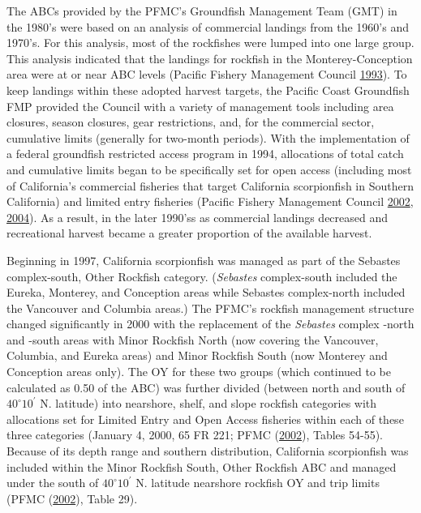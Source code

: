 \documentclass[12pt,]{article}
\begin{document}
The ABCs provided by the PFMC's Groundfish Management Team (GMT) in the
1980's were based on an analysis of commercial landings from the 1960's
and 1970's. For this analysis, most of the rockfishes were lumped into
one large group. This analysis indicated that the landings for rockfish
in the Monterey-Conception area were at or near ABC levels (Pacific
Fishery Management Council \protect\hyperlink{ref-PFMC1993}{1993}). To
keep landings within these adopted harvest targets, the Pacific Coast
Groundfish FMP provided the Council with a variety of management tools
including area closures, season closures, gear restrictions, and, for
the commercial sector, cumulative limits (generally for two-month
periods). With the implementation of a federal groundfish restricted
access program in 1994, allocations of total catch and cumulative limits
began to be specifically set for open access (including most of
California's commercial fisheries that target California scorpionfish in
Southern California) and limited entry fisheries (Pacific Fishery
Management Council \protect\hyperlink{ref-PFMC2002}{2002},
\protect\hyperlink{ref-PFMC2004}{2004}). As a result, in the later
1990'ss as commercial landings decreased and recreational harvest became
a greater proportion of the available harvest.

Beginning in 1997, California scorpionfish was managed as part of the
Sebastes complex-south, Other Rockfish category. (\emph{Sebastes}
complex-south included the Eureka, Monterey, and Conception areas while
Sebastes complex-north included the Vancouver and Columbia areas.) The
PFMC's rockfish management structure changed significantly in 2000 with
the replacement of the \emph{Sebastes} complex -north and -south areas
with Minor Rockfish North (now covering the Vancouver, Columbia, and
Eureka areas) and Minor Rockfish South (now Monterey and Conception
areas only). The OY for these two groups (which continued to be
calculated as 0.50 of the ABC) was further divided (between north and
south of \(40^\circ 10^\prime\) N. latitude) into nearshore, shelf, and
slope rockfish categories with allocations set for Limited Entry and
Open Access fisheries within each of these three categories (January 4,
2000, 65 FR 221; PFMC (\protect\hyperlink{ref-PFMC2002}{2002}), Tables
54-55). Because of its depth range and southern distribution, California
scorpionfish was included within the Minor Rockfish South, Other
Rockfish ABC and managed under the south of \(40^\circ 10^\prime\) N.
latitude nearshore rockfish OY and trip limits (PFMC
(\protect\hyperlink{ref-PFMC2002}{2002}), Table 29).
\end{document}
